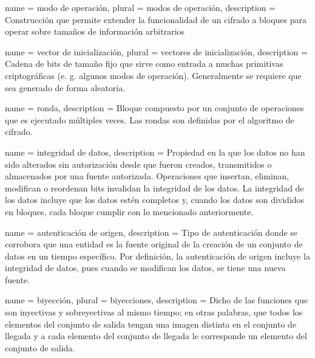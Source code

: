 %
%
%

\makeglossaries


{
  name = modo de operación,
  plural = modos de operación,
  description = {
    Construcción que permite extender la funcionalidad de un cifrado a bloques
    para operar sobre tamaños de información arbitrarios%
  }
}

{
  name = vector de inicialización,
  plural = vectores de inicialización,
  description = {
    Cadena de bits de tamaño fijo que sirve como entrada a muchas primitivas
    criptográficas (e. g. algunos modos de operación). Generalmente se requiere
    que sea generado de forma aleatoria.
  }
}

{
  name = ronda,
  description = {
    Bloque compuesto por un conjunto de operaciones que es ejecutado
    múltiples veces. Las rondas son definidas por el algoritmo de cifrado.
  }
}

{
  name = integridad de datos,
  description = {
    Propiedad en la que los datos no han sido alterados sin autorización desde
    que fueron creados, transmitidos o almacenados por una fuente autorizada.
    Operaciones que insertan, eliminan, modifican o reordenan bits invalidan
    la integridad de los datos. La integridad de los datos incluye que los
    datos estén completos y, cuando los datos son divididos en bloques, cada
    bloque cumplir con lo mencionado anteriormente.
  }
}

{
  name = autenticación de origen,
  description = {
    Tipo de autenticación donde se corrobora que una entidad es la fuente
    original de la creación de un conjunto de datos en un tiempo específico.
    Por definición, la autenticación de origen incluye la integridad de datos,
    pues cuando se modifican los datos, se tiene una nueva fuente.
  }
}

{
  name = biyección,
  plural = biyecciones,
  description = {
    Dicho de las funciones que son inyectivas y sobreyectivas
    al mismo tiempo; en otras palabras, que todos los elementos
    del conjunto de salida tengan una imagen distinta en el conjunto
    de llegada y a cada elemento del conjunto de llegada le corresponde
    un elemento del conjunto de salida.
  }
}

